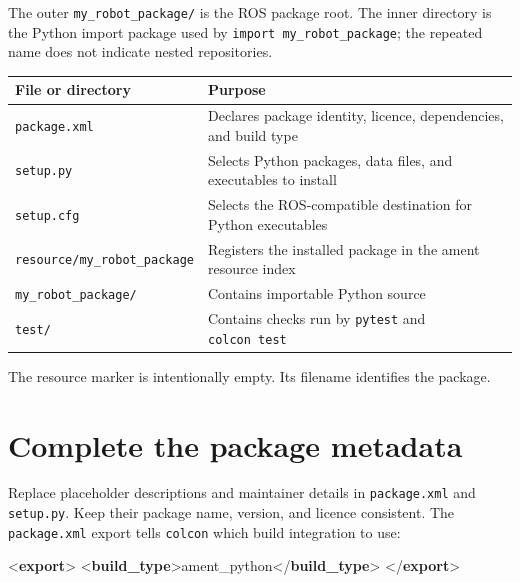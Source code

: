 \documentclass[
  australian,
  12pt,
  letterpaper,
  DIV=11,
  numbers=noendperiod,
  twoside]{scrreprt}
\newenvironment{Shaded}{\begin{snugshade}}{\end{snugshade}}
\newcommand{\KeywordTok}[1]{\textcolor[rgb]{0.00,0.23,0.31}{\textbf{#1}}}
\newcommand{\NormalTok}[1]{\textcolor[rgb]{0.00,0.23,0.31}{#1}}
\newcounter{none} %
\begin{document}
The outer \texttt{my\_robot\_package/} is the ROS package root. The
inner directory is the Python import package used by
\texttt{import\ my\_robot\_package}; the repeated name does not indicate
nested repositories.

{\def\LTcaptype{none} %
\begin{longtable}[]{@{}
  >{\raggedright\arraybackslash}p{}
  >{\raggedright\arraybackslash}p{}@{}}
\toprule\noalign{}
\begin{minipage}[b]{\linewidth}\raggedright
File or directory
\end{minipage} & \begin{minipage}[b]{\linewidth}\raggedright
Purpose
\end{minipage} \\
\midrule\noalign{}
\endhead
\bottomrule\noalign{}
\endlastfoot
\texttt{package.xml} & Declares package identity, licence, dependencies,
and build type \\
\texttt{setup.py} & Selects Python packages, data files, and executables
to install \\
\texttt{setup.cfg} & Selects the ROS-compatible destination for Python
executables \\
\texttt{resource/my\_robot\_package} & Registers the installed package
in the ament resource index \\
\texttt{my\_robot\_package/} & Contains importable Python source \\
\texttt{test/} & Contains checks run by \texttt{pytest} and
\texttt{colcon\ test} \\
\end{longtable}
}

The resource marker is intentionally empty. Its filename identifies the
package.

\section{Complete the package
metadata}\label{complete-the-package-metadata}

Replace placeholder descriptions and maintainer details in
\texttt{package.xml} and \texttt{setup.py}. Keep their package name,
version, and licence consistent. The \texttt{package.xml} export tells
\texttt{colcon} which build integration to use:

\begin{Shaded}
\begin{Highlighting}[]
\NormalTok{\textless{}}\KeywordTok{export}\NormalTok{\textgreater{}}
\NormalTok{  \textless{}}\KeywordTok{build\_type}\NormalTok{\textgreater{}ament\_python\textless{}/}\KeywordTok{build\_type}\NormalTok{\textgreater{}}
\NormalTok{\textless{}/}\KeywordTok{export}\NormalTok{\textgreater{}}
\end{Highlighting}
\end{Shaded}
\end{document}
